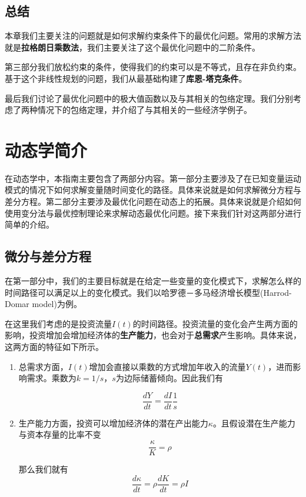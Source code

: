 \documentclass[UTF8,12pt]{ctexart}
\numberwithin{equation}{section} %
\numberwithin{figure}{section}
\numberwithin{table}{section}
\begin{document}
	\subsection{总结}
	本章我们主要关注的问题就是如何求解约束条件下的最优化问题。常用的求解方法就是\textbf{拉格朗日乘数法}，我们主要关注了这个最优化问题中的二阶条件。
	
	第三部分我们放松约束的条件，使得我们的约束可以是不等式，且存在非负约束。基于这个非线性规划的问题，我们从最基础构建了\textbf{库恩-塔克条件}。
	
	最后我们讨论了最优化问题中的极大值函数以及与其相关的包络定理。我们分别考虑了两种情况下的包络定理，并介绍了与其相关的一些经济学例子。
	
	\newpage
	
	\section{动态学简介}
	在动态学中，本指南主要包含了两部分内容。第一部分主要涉及了在已知变量运动模式的情况下如何求解变量随时间变化的路径。具体来说就是如何求解微分方程与差分方程。第二部分主要涉及最优化问题在动态上的拓展。具体来说就是介绍如何使用变分法与最优控制理论来求解动态最优化问题。接下来我们针对这两部分进行简单的介绍。
	
	\subsection{微分与差分方程}
	
	在第一部分中，我们的主要目标就是在给定一些变量的变化模式下，求解怎么样的时间路径可以满足以上的变化模式。我们以哈罗德－多马经济增长模型(Harrod-Domar model)为例。
	
	在这里我们考虑的是投资流量$I(t)$的时间路径。投资流量的变化会产生两方面的影响，投资增加会增加经济体的\textbf{生产能力}，也会对于\textbf{总需求}产生影响。具体来说，这两方面的特征如下所示。
	
	\begin{enumerate}
		\item 总需求方面，$I(t)$增加会直接以乘数的方式增加年收入的流量$Y(t)$，进而影响需求。乘数为$k = 1/s$，$s$为边际储蓄倾向。因此我们有
		
		\begin{equation}
			\frac{dY}{dt} = \frac{dI}{dt} \frac{1}{s}
		\end{equation}
		
		\item 生产能力方面，投资可以增加经济体的潜在产出能力$\kappa$。且假设潜在生产能力与资本存量的比率不变
		\begin{equation}
			\frac{\kappa}{K} = \rho
		\end{equation}
		
		那么我们就有
		\begin{equation}
			\frac{d \kappa}{d t} = \rho \frac{d K}{d t} = \rho I
		\end{equation}
	\end{enumerate}
	
\end{document}
